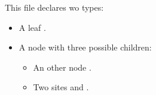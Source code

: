 \documentclass[10pt,a4paper]{article}
\begin{document}
This file declares wo types:

\begin{itemize}
\item A leaf .
\item A node  with three possible children:
  \begin{itemize}
  \item An other node .
  \item Two sites  and .
  \end{itemize}
\end{itemize}
\end{document}
